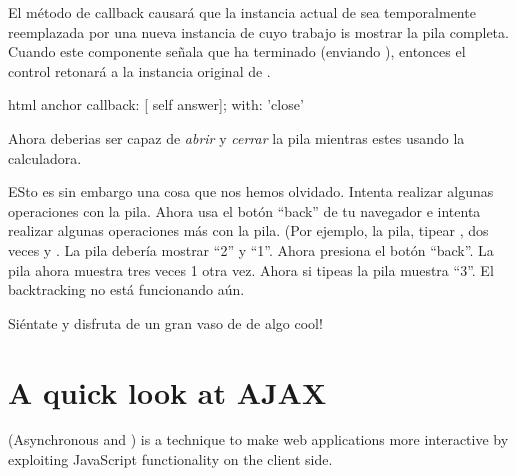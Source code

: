 \documentclass[a4paper,10pt,twoside]{book}
\begin{document}
El m\'etodo de callback causar\'a que la instancia actual de  sea temporalmente reemplazada por una nueva instancia de  
cuyo trabajo is mostrar la pila completa.
Cuando este componente se\~nala que ha terminado (\ie enviando ), entonces el control retonar\'a a la instancia original de .


\begin{code}{}
html anchor
	callback: [ self answer];
	with: 'close'
\end{code}

Ahora deberias ser capaz de \emph{abrir} y \emph{cerrar} la pila mientras estes usando la calculadora.

ESto es sin embargo una cosa que nos hemos olvidado.
Intenta realizar algunas operaciones con la pila.
Ahora usa el bot\'on ``back'' de tu navegador e intenta realizar algunas operaciones m\'as con la pila.
(Por ejemplo,  la pila, tipear ,  dos veces y \menu {+}.
La pila deber\'ia mostrar ``2'' y ``1''.
Ahora presiona el bot\'on ``back''.
La pila ahora muestra tres veces 1 otra vez.
Ahora si tipeas \menu{+} la pila muestra ``3''.
El backtracking no est\'a funcionando a\'un.


Si\'entate y disfruta de un gran vaso de de algo cool!

\section{A quick look at AJAX}


 (Asynchronous  and ) is a technique to make web applications more interactive by exploiting JavaScript functionality on the client side.
\end{document}
